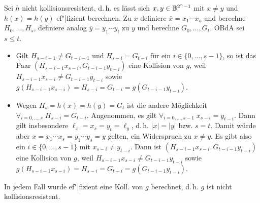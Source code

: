 \begin{Beweis}
    Sei $h$ nicht kollisionsresistent,
    d.\,h. es lässt sich $x, y \in \mathbb{B}^{2^n-1}$ mit
    $x \not= y$ und $h(x) = h(y)$ ef"|fizient berechnen.
    Zu $x$ definiere $\overline{x} = x_1 \dotsb x_s$ und berechne $H_0, \dotsc, H_s$,
    definiere analog $\overline{y} = y_1 \dotsb y_t$ zu $y$ und berechne $G_0, \dotsc, G_t$.
    OBdA sei $s \le t$.
    \begin{itemize}
        \item
        Gilt $H_{s-i-1} \not= G_{t-i-1}$ und $H_{s-i} = G_{t-i}$ für ein
        $i \in \{0, \dotsc, s-1\}$,
        so ist das Paar $(H_{s-i-1} x_{s-i}, G_{t-i-1} y_{t-i})$ eine Kollision von $g$, weil\\
        $H_{s-i-1} x_{s-i} \not= G_{t-i-1} y_{t-i}$ sowie
        $g(H_{s-i-1} x_{s-i}) = H_{s-i} = G_{t-i} = g(G_{t-i-1} y_{t-i})$.

        \item
        Wegen $H_s = h(x) = h(y) = G_t$
        ist die andere Möglichkeit $\forall_{i=0,\dotsc,s}\; H_{s-i} = G_{t-i}$.
        Angenommen, es gilt $\forall_{i=0,\dotsc,s-1}\; x_{s-i} = y_{t-i}$.
        Dann gilt insbesondere $\ell_x = x_s = y_t = \ell_y$, d.\,h.
        $|x| = |y|$ bzw. $s = t$.
        Damit würde aber $x = x_1 \dotsb x_s = y_1 \dotsb y_s = y$ gelten,
        ein Widerspruch zu $x \not= y$.
        Es gibt also ein $i \in \{0, \dotsc, s-1\}$ mit $x_{s-i} \not= y_{t-i}$.
        Dann ist $(H_{s-i-1} x_{s-i}, G_{t-i-1} y_{t-i})$ eine Kollision von $g$, weil
        $H_{s-i-1} x_{s-i} \not= G_{t-i-1} y_{t-i}$ sowie
        $g(H_{s-i-1} x_{s-i}) = H_{s-i} = G_{t-i} = g(G_{t-i-1} y_{t-i})$.
    \end{itemize}
    In jedem Fall wurde ef"|fizient eine Koll. von $g$ berechnet, d.\,h. $g$ ist nicht
    kollisionsresistent.
\end{Beweis}

\pagebreak
